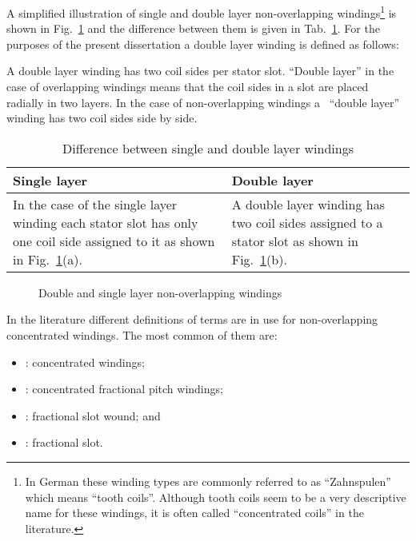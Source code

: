 A simplified illustration of single and double layer non-overlapping windings\footnote{In German these winding types are commonly referred to as ``Zahnspulen'' which means ``tooth coils''. Although tooth coils seem to be a very descriptive name for these windings, it is often called ``concentrated coils'' in the literature.} is shown in Fig.~\ref{fig:concen_coils} and the difference between them is given in Tab.~\ref{tab:single_vs_double}. For the purposes of the present dissertation a double layer winding is defined as follows:
\begin{defth}
  A double layer winding has two coil sides per stator slot. ``Double layer'' in the~%
  case of overlapping windings means that the coil sides in a slot are placed~%
  radially in two layers. In the case of non-overlapping windings a~%
  ``double layer'' winding has two coil sides side by side.
\end{defth} 
\begin{table}[htbp]
  \caption{Difference between single and double layer windings}
  \label{tab:single_vs_double}
  \begin{tabularx}{\textwidth}{XX}
    \toprule
    \textbf{Single layer}  & \textbf{Double layer} \\\toprule
    In the case of the single layer winding each stator slot has only one coil side
    assigned to it as shown in Fig.~\ref{fig:concen_coils}(a).
    & 
    A double layer winding has two coil sides assigned to a stator slot as shown in
    Fig.~\ref{fig:concen_coils}(b).\\
    \bottomrule
  \end{tabularx}
\end{table}
\begin{figure}[htbp]
	\centering
		
	\caption{Double and single layer non-overlapping windings}
	\label{fig:concen_coils}
\end{figure}

In the literature different definitions of terms are in use for non-overlapping concentrated windings. The most common of them are:
\begin{itemize}
	\item \cite{REF-00822}: concentrated windings;
	\item \cite{REF-00823}: concentrated fractional pitch windings; 
	\item \cite{REF-00815}: fractional slot wound; and
	\item \cite{REF-01044}: fractional slot. 
\end{itemize}

